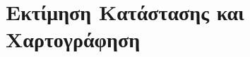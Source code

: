 \documentclass[10pt, compress]{beamer}
\begin{document}
\section{Εκτίμηση Κατάστασης και Χαρτογράφηση}

\end{document}
